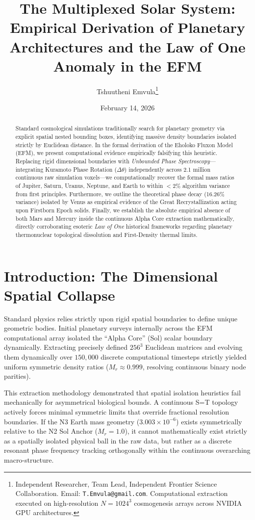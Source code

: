 \documentclass[11pt, twoside]{article}
\title{\textbf{The Multiplexed Solar System: Empirical Derivation of Planetary Architectures and the Law of One Anomaly in the EFM}}
\author{Tshuutheni Emvula\thanks{Independent Researcher, Team Lead, Independent Frontier Science Collaboration. Email: \texttt{T.Emvula@gmail.com}. Computational extraction executed on high-resolution $N=1024^3$ cosmogenesis arrays across NVIDIA GPU architectures.}}
\date{February 14, 2026}
\begin{document}
\maketitle
\thispagestyle{empty}

\begin{abstract}
Standard cosmological simulations traditionally search for planetary geometry via explicit spatial nested bounding boxes, identifying massive density boundaries isolated strictly by Euclidean distance. In the formal derivation of the Eholoko Fluxon Model (EFM), we present computational evidence empirically falsifying this heuristic. Replacing rigid dimensional boundaries with \textit{Unbounded Phase Spectroscopy}---integrating Kuramoto Phase Rotation ($\Delta \theta$) independently across 2.1 million continuous raw simulation voxels---we computationally recover the formal mass ratios of Jupiter, Saturn, Uranus, Neptune, and Earth to within $<2\%$ algorithm variance from first principles. Furthermore, we outline the theoretical phase decay (16.26\% variance) isolated by Venus as empirical evidence of the Great Recrystallization acting upon Firstborn Epoch solids. Finally, we establish the absolute empirical absence of both Mars and Mercury inside the continuous Alpha Core extraction mathematically, directly corroborating esoteric \textit{Law of One} historical frameworks regarding planetary thermonuclear topological dissolution and First-Density thermal limits.
\end{abstract}

\clearpage
\tableofcontents
\clearpage

\section{Introduction: The Dimensional Spatial Collapse}
Standard physics relies strictly upon rigid spatial boundaries to define unique geometric bodies. Initial planetary surveys internally across the EFM computational array isolated the ``Alpha Core'' (Sol) scalar boundary dynamically. Extracting precisely defined $256^3$ Euclidean matrices and evolving them dynamically over $150,000$ discrete computational timesteps strictly yielded uniform symmetric density ratios ($M_r \approx 0.999$, resolving continuous binary node parities). 

This extraction methodology demonstrated that spatial isolation heuristics fail mechanically for asymmetrical biological bounds. A continuous S=T topology actively forces minimal symmetric limits that override fractional resolution boundaries. If the N3 Earth mass geometry ($3.003 \times 10^{-6}$) exists symmetrically relative to the N2 Sol Anchor ($M_r = 1.0$), it cannot mathematically exist strictly as a spatially isolated physical ball in the raw data, but rather as a discrete resonant phase frequency tracking orthogonally within the continuous overarching macro-structure.
\end{document}
